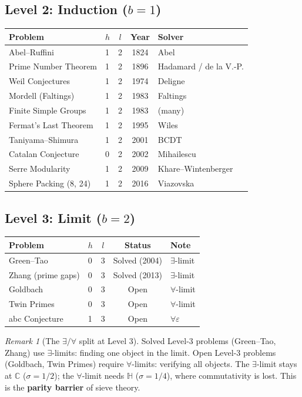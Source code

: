 \documentclass[12pt]{article}
\theoremstyle{remark}
\newtheorem{remark}[theorem]{Remark}
\newcommand{\CC}{\mathbb{C}}
\newcommand{\HH}{\mathbb{H}}
\begin{document}
\subsection{Level 2: Induction ($b = 1$)}

\begin{center}
\begin{tabular}{llccl}
\toprule
Problem & $h$ & $l$ & Year & Solver \\
\midrule
Abel--Ruffini & 1 & 2 & 1824 & Abel \\
Prime Number Theorem & 1 & 2 & 1896 & Hadamard / de la V.-P. \\
Weil Conjectures & 1 & 2 & 1974 & Deligne \\
Mordell (Faltings) & 1 & 2 & 1983 & Faltings \\
Finite Simple Groups & 1 & 2 & 1983 & (many) \\
Fermat's Last Theorem & 1 & 2 & 1995 & Wiles \\
Taniyama--Shimura & 1 & 2 & 2001 & BCDT \\
Catalan Conjecture & 0 & 2 & 2002 & Mihailescu \\
Serre Modularity & 1 & 2 & 2009 & Khare--Wintenberger \\
Sphere Packing (8, 24) & 1 & 2 & 2016 & Viazovska \\
\bottomrule
\end{tabular}
\end{center}

\subsection{Level 3: Limit ($b = 2$)}

\begin{center}
\begin{tabular}{llccl}
\toprule
Problem & $h$ & $l$ & Status & Note \\
\midrule
Green--Tao & 0 & 3 & Solved (2004) & $\exists$-limit \\
Zhang (prime gaps) & 0 & 3 & Solved (2013) & $\exists$-limit \\
Goldbach & 0 & 3 & Open & $\forall$-limit \\
Twin Primes & 0 & 3 & Open & $\forall$-limit \\
abc Conjecture & 1 & 3 & Open & $\forall\varepsilon$ \\
\bottomrule
\end{tabular}
\end{center}

\begin{remark}[The $\exists/\forall$ split at Level 3]
Solved Level-3 problems (Green--Tao, Zhang) use
$\exists$-limits: finding one object in the limit.
Open Level-3 problems (Goldbach, Twin Primes) require
$\forall$-limits: verifying all objects.
The $\exists$-limit stays at $\CC$ ($\sigma = 1/2$);
the $\forall$-limit needs $\HH$ ($\sigma = 1/4$),
where commutativity is lost.
This is the \textbf{parity barrier} of sieve theory.
\end{remark}
\end{document}
